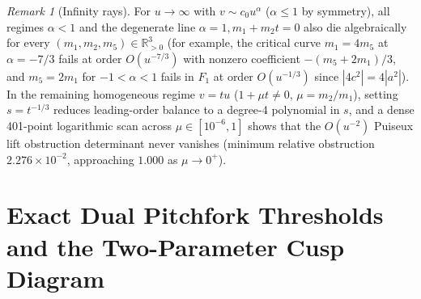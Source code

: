 \documentclass[11pt,a4paper]{amsart}
\theoremstyle{definition}
\theoremstyle{remark}
\newtheorem{remark}[theorem]{Remark}
\newcommand{\R}{\mathbb{R}}
\begin{document}
\begin{remark}[Infinity rays]
For $u \to \infty$ with $v \sim c_0 u^\alpha$ ($\alpha \le 1$ by symmetry), all
regimes $\alpha < 1$ and the degenerate line $\alpha = 1, m_1 + m_2 t = 0$ also die
algebraically for every $(m_1, m_2, m_5) \in \R_{>0}^3$ (for example, the critical
curve $m_1 = 4 m_5$ at $\alpha = -7/3$ fails at order $O(u^{-7/3})$ with nonzero
coefficient $-(m_5 + 2m_1)/3$, and $m_5 = 2 m_1$ for $-1 < \alpha < 1$ fails in $F_1$
at order $O(u^{-1/3})$ since $|4 c^2| = 4|a^2|$).
In the remaining homogeneous regime $v = t u$ ($1 + \mu t \neq 0$, $\mu = m_2/m_1$),
setting $s = t^{-1/3}$ reduces leading-order balance to a degree-4 polynomial in $s$,
and a dense 401-point logarithmic scan across $\mu \in [10^{-6}, 1]$ shows that the
$O(u^{-2})$ Puiseux lift obstruction determinant never vanishes (minimum relative
obstruction $2.276 \times 10^{-2}$, approaching $1.000$ as $\mu \to 0^+$).
\end{remark}

\section{Exact Dual Pitchfork Thresholds and the Two-Parameter Cusp Diagram}
\end{document}
